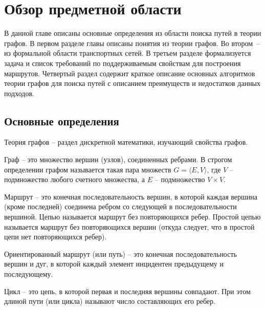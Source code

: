\chapter{Обзор предметной области}
В данной главе описаны основные определения из области поиска путей в теории графов. В первом разделе главы описаны понятия из теории графов. Во втором~-- из формальной области транспортных сетей. В третьем разделе формализуется задача и список требований по поддерживаемым свойствам для построения маршрутов. Четвертый раздел содержит краткое описание основных алгоритмов теории графов для поиска путей с описанием преимуществ и недостатков данных подходов.

\section{Основные определения}
\begin{definition}
Теория графов -- раздел дискретной математики, изучающий свойства графов.
\end{definition}

\begin{definition}
Граф -- это множество вершин (узлов), соединенных ребрами. В строгом определении графом называется такая пара множеств $G=\langle E, V \rangle$, где $V$ -- подмножество любого счетного множества, а $E$ -- подмножество $V \times V$.
\end{definition}

\begin{definition}
Маршрут -- это конечная последовательность вершин, в которой каждая вершина (кроме последней) соединена ребром со следующей в последовательности вершиной. Цепью называется маршрут без повторяющихся ребер. Простой цепью называется маршрут без повторяющихся вершин (откуда следует, что в простой цепи нет повторяющихся ребер).
\end{definition}

\begin{definition}
Ориентированный маршрут (или путь) -- это конечная последовательность вершин и дуг, в которой каждый элемент инцидентен предыдущему и последующему.
\end{definition}

\begin{definition}
Цикл -- это цепь, в которой первая и последняя вершины совпадают. При этом длиной пути (или цикла) называют число составляющих его ребер.
\end{definition}

